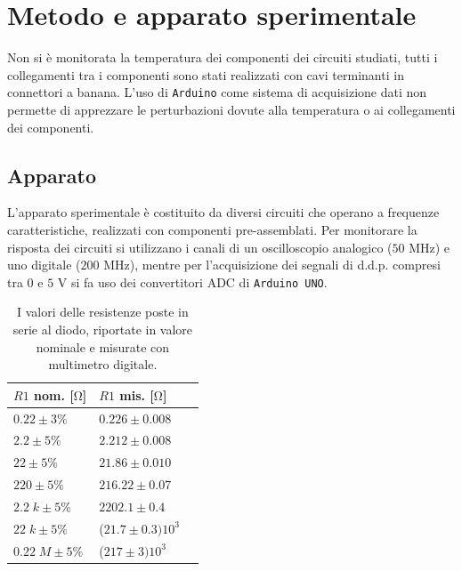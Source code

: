 \documentclass{article}[a4paper, oneside, 11pt]
\begin{document}
\section{Metodo e apparato sperimentale}
Non si è monitorata la temperatura dei componenti dei circuiti studiati,
tutti i collegamenti tra i componenti sono stati realizzati con cavi
terminanti in connettori a banana. L'uso di \verb+Arduino+\cite{arduino}
come sistema di acquisizione dati non permette di apprezzare le perturbazioni
dovute alla temperatura o ai collegamenti dei componenti.
\subsection{Apparato}
L'apparato sperimentale \`e costituito da diversi circuiti che operano a
frequenze caratteristiche, realizzati con componenti pre-assemblati. Per
monitorare la risposta dei circuiti si utilizzano i canali di un oscilloscopio
analogico ($50$ MHz) e uno digitale ($200$ MHz), mentre per l'acquisizione dei
segnali di d.d.p. compresi tra $0$ e $5$ V si fa uso dei convertitori ADC di
\verb+Arduino UNO+.

\begin{table}[H]
\begin{center}
\begin{tabular}{lll}
	\toprule
	$R1$ nom. [$\si{\ohm}$] & $R1$ mis. [$\si{\ohm}$] \\ 
	\midrule
	\midrule
	$0.22 \pm 3 \% $         	& $0.226 \pm 0.008$ \\
	$2.2 \pm 5 \% $          	& $2.212 \pm 0.008$ \\
	$22 \pm 5 \% $           	& $21.86 \pm 0.010$ \\ 
	$220 \pm 5 \% $          	& $216.22 \pm 0.07$ \\
	$2.2\; \si{k} \pm 5 \% $       & $2202.1 \pm 0.4$ \\
	$22\; \si{k} \pm 5 \% $       & ($21.7 \pm 0.3)10^3$ \\
	$0.22\; \si{M} \pm 5 \% $      & ($217 \pm 3)10^3$ \\
	\bottomrule
\end{tabular}
\caption{I valori delle resistenze poste in serie al diodo, riportate in
	valore nominale e misurate con multimetro digitale. \label{tab: res}}
\end{center}
\end{table}
\end{document}
